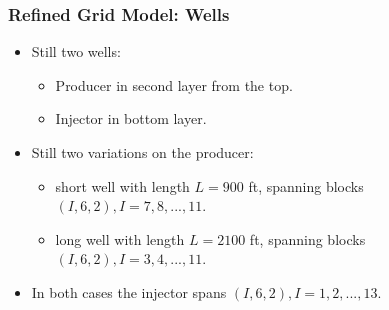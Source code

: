 \begin{frame}
    \frametitle{Refined Grid Model: Wells}
    \begin{itemize}
        \item Still two wells:
        \begin{itemize}
            \item Producer in second layer from the top.
            \item Injector in bottom layer.
        \end{itemize}
        \item Still two variations on the producer:
        \begin{itemize}
            \item short well with length $L=900$ ft, spanning blocks $(I,6,2), I=7,8,...,11$.
            \item long well with length $L=2100$ ft, spanning blocks $(I,6,2), I=3,4,...,11$.
        \end{itemize}
        \item In both cases the injector spans $(I,6,2), I=1,2,...,13$.
    \end{itemize}
\end{frame}
